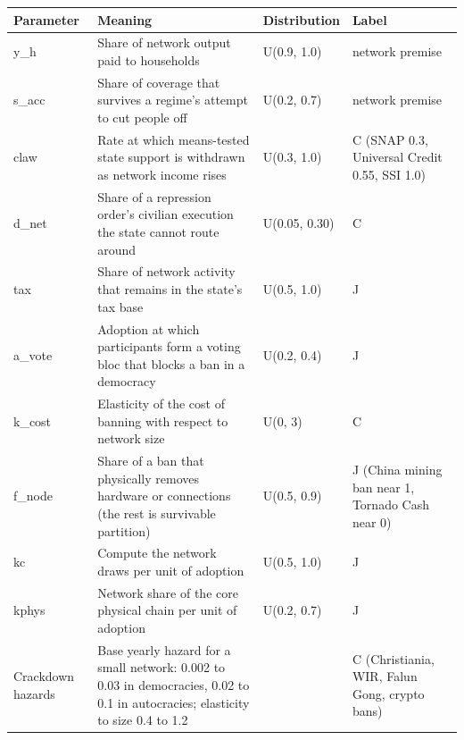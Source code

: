 \documentclass[
  10pt,
]{article}
\newcounter{none} %
\begin{document}
{\def\LTcaptype{none} %
\begin{longtable}[]{@{}
  >{\raggedright\arraybackslash}p{}
  >{\raggedright\arraybackslash}p{}
  >{\raggedright\arraybackslash}p{}
  >{\raggedright\arraybackslash}p{}@{}}
\toprule\noalign{}
\begin{minipage}[b]{\linewidth}\raggedright
Parameter
\end{minipage} & \begin{minipage}[b]{\linewidth}\raggedright
Meaning
\end{minipage} & \begin{minipage}[b]{\linewidth}\raggedright
Distribution
\end{minipage} & \begin{minipage}[b]{\linewidth}\raggedright
Label
\end{minipage} \\
\midrule\noalign{}
\endhead
\bottomrule\noalign{}
\endlastfoot
y\_h & Share of network output paid to households & U(0.9, 1.0) & network premise \\
s\_acc & Share of coverage that survives a regime's attempt to cut people off & U(0.2, 0.7) &
network premise \\
claw & Rate at which means-tested state support is withdrawn as network income rises & U(0.3, 1.0) &
C (SNAP 0.3, Universal Credit 0.55, SSI 1.0) \\
d\_net & Share of a repression order's civilian execution the state cannot route around & U(0.05,
0.30) & C \\
tax & Share of network activity that remains in the state's tax base & U(0.5, 1.0) & J \\
a\_vote & Adoption at which participants form a voting bloc that blocks a ban in a democracy &
U(0.2, 0.4) & J \\
k\_cost & Elasticity of the cost of banning with respect to network size & U(0, 3) & C \\
f\_node & Share of a ban that physically removes hardware or connections (the rest is survivable
partition) & U(0.5, 0.9) & J (China mining ban near 1, Tornado Cash near 0) \\
kc & Compute the network draws per unit of adoption & U(0.5, 1.0) & J \\
kphys & Network share of the core physical chain per unit of adoption & U(0.2, 0.7) & J \\
Crackdown hazards & Base yearly hazard for a small network: 0.002 to 0.03 in democracies, 0.02 to
0.1 in autocracies; elasticity to size 0.4 to 1.2 & & C (Christiania, WIR, Falun Gong, crypto
bans) \\
\end{longtable}
}
\end{document}
